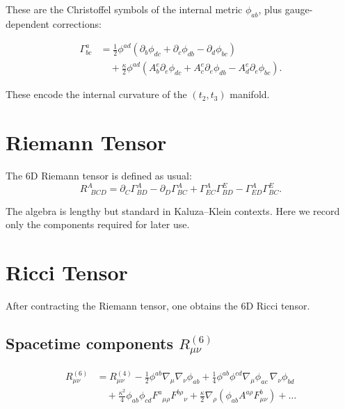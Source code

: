 \documentclass[12pt]{article}
\begin{document}
These are the Christoffel symbols of the internal metric \(\phi_{ab}\),
plus gauge-dependent corrections:

\begin{align}
\Gamma^a_{bc}
&=
\frac{1}{2}\phi^{ad}
\left(
\partial_b\phi_{dc}
+\partial_c\phi_{db}
-\partial_d\phi_{bc}
\right)
\nonumber\\
&\quad
+ \frac{\kappa}{2} \phi^{ad}
\left(
A^e_b\partial_e \phi_{dc}
+ A^e_c\partial_e \phi_{db}
- A^e_d\partial_e \phi_{bc}
\right).
\end{align}

These encode the internal curvature of the \((t_2,t_3)\) manifold.


\newpage
\section{Riemann Tensor}

The 6D Riemann tensor is defined as usual:
\[
R^A_{\,\,\,BCD}
=
\partial_C \Gamma^A_{BD}
- \partial_D \Gamma^A_{BC}
+ \Gamma^A_{EC}\Gamma^E_{BD}
- \Gamma^A_{ED}\Gamma^E_{BC}.
\]

The algebra is lengthy but standard in Kaluza--Klein contexts. Here we
record only the components required for later use.


\newpage
\section{Ricci Tensor}

After contracting the Riemann tensor, one obtains the 6D Ricci tensor.


\subsection{Spacetime components \texorpdfstring{$R_{\mu\nu}^{(6)}$}{Rmunu6}}

\begin{align}
R_{\mu\nu}^{(6)}
&= 
R_{\mu\nu}^{(4)}
-\frac{1}{2}\phi^{ab}\nabla_\mu\nabla_\nu\phi_{ab}
+ \frac{1}{4}\phi^{ab}\phi^{cd}\nabla_\mu\phi_{ac}\,\nabla_\nu\phi_{bd}
\nonumber\\
&\quad
+ \frac{\kappa^2}{4}\phi_{ab}\phi_{cd}
F^{a}{}_{\mu\rho} F^{b\rho}{}_{\nu}
+ \frac{\kappa}{2}\nabla_\rho(\phi_{ab}A^{a\rho}F^b_{\mu\nu})
+ \dots
\end{align}
\end{document}
